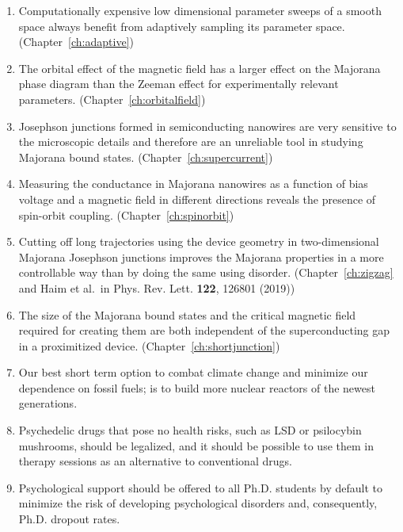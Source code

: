 \documentclass{dissertation}
\begin{document}
\begin{enumerate}

\item Computationally expensive low dimensional parameter sweeps of a smooth space always benefit from adaptively sampling its parameter space. (Chapter~\ref{ch:adaptive})

\item The orbital effect of the magnetic field has a larger effect on the Majorana phase diagram than the Zeeman effect for experimentally relevant parameters. (Chapter~\ref{ch:orbitalfield})

\item Josephson junctions formed in semiconducting nanowires are very sensitive to the microscopic details and therefore are an unreliable tool in studying Majorana bound states. (Chapter~\ref{ch:supercurrent})

\item Measuring the conductance in Majorana nanowires as a function of bias voltage and a magnetic field in different directions reveals the presence of spin-orbit coupling. (Chapter~\ref{ch:spinorbit})

\item Cutting off long trajectories using the device geometry in two-dimensional Majorana Josephson junctions improves the Majorana properties in a more controllable way than by doing the same using disorder. (Chapter~\ref{ch:zigzag} and Haim et al.~in Phys. Rev. Lett. \textbf{122}, 126801 (2019))

\item The size of the Majorana bound states and the critical magnetic field required for creating them are both independent of the superconducting gap in a proximitized device. (Chapter~\ref{ch:shortjunction})

\item Our best short term option to combat climate change and minimize our dependence on fossil fuels; is to build more nuclear reactors of the newest generations.

\item Psychedelic drugs that pose no health risks, such as LSD or psilocybin mushrooms, should be legalized, and it should be possible to use them in therapy sessions as an alternative to conventional drugs.

\item Psychological support should be offered to all Ph.D. students by default to minimize the risk of developing psychological disorders and, consequently, Ph.D. dropout rates.


\end{enumerate}
\end{document}
